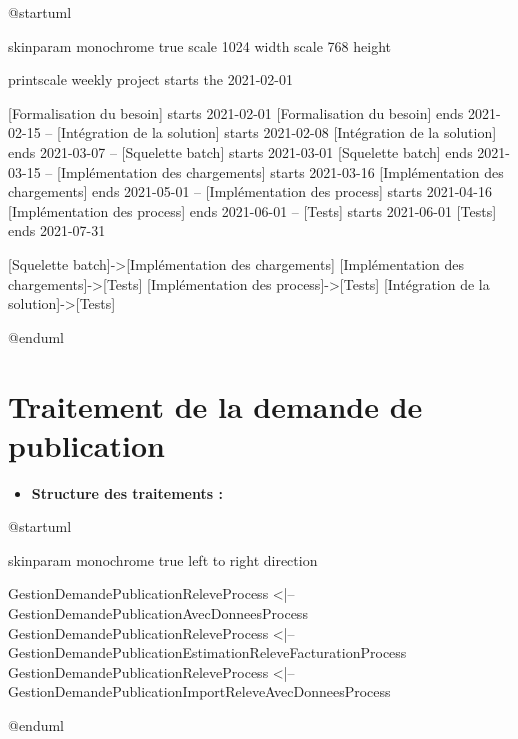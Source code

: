 \documentclass[a4paper, 12pt]{report}
\begin{document}
\begin{center}
  \begin{plantuml}
    @startuml

    skinparam monochrome true
    scale 1024 width
    scale 768 height

    printscale weekly
    project starts the 2021-02-01

    [Formalisation du besoin] starts 2021-02-01
    [Formalisation du besoin] ends 2021-02-15
    --
    [Intégration de la solution] starts 2021-02-08
    [Intégration de la solution] ends 2021-03-07
    --
    [Squelette batch] starts 2021-03-01
    [Squelette batch] ends 2021-03-15
    --
    [Implémentation des chargements] starts 2021-03-16
    [Implémentation des chargements] ends 2021-05-01
    --
    [Implémentation des process] starts 2021-04-16
    [Implémentation des process] ends 2021-06-01
    --
    [Tests] starts 2021-06-01
    [Tests] ends 2021-07-31

    [Squelette batch]->[Implémentation des chargements]
    [Implémentation des chargements]->[Tests]
    [Implémentation des process]->[Tests]
    [Intégration de la solution]->[Tests]

    @enduml
  \end{plantuml}
\end{center}

\chapter{Traitement de la demande de publication}
\label{appendix:process}

\begin{itemize}
  \item \textbf{Structure des traitements :}\\
\end{itemize}

\begin{center}
  \begin{plantuml}
    @startuml

    skinparam monochrome true
    left to right direction

    GestionDemandePublicationReleveProcess <|-- GestionDemandePublicationAvecDonneesProcess
    GestionDemandePublicationReleveProcess <|-- GestionDemandePublicationEstimationReleveFacturationProcess
    GestionDemandePublicationReleveProcess <|-- GestionDemandePublicationImportReleveAvecDonneesProcess

    @enduml
  \end{plantuml}
\end{center}
\vspace{0.5cm}
\end{document}

